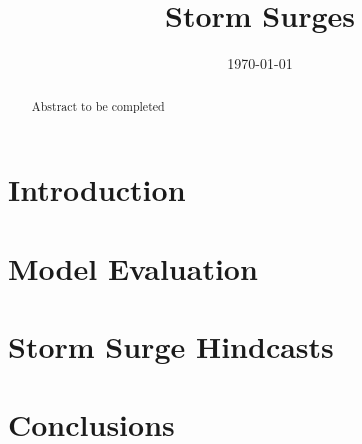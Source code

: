 \documentclass[pdftex,12pt]{article}
\title{Storm Surges}
\date{\today}
\begin{document}
\maketitle

\begin{abstract}
Abstract to be completed
\end{abstract}

\section{Introduction}\label{sec:intro}
\citep{masson2004modelling} %

\section{Model Evaluation}\label{sec:model}


\section{Storm Surge Hindcasts}\label{sec:storm}

\section{Conclusions}\label{sec:conclusions}




\end{document}
